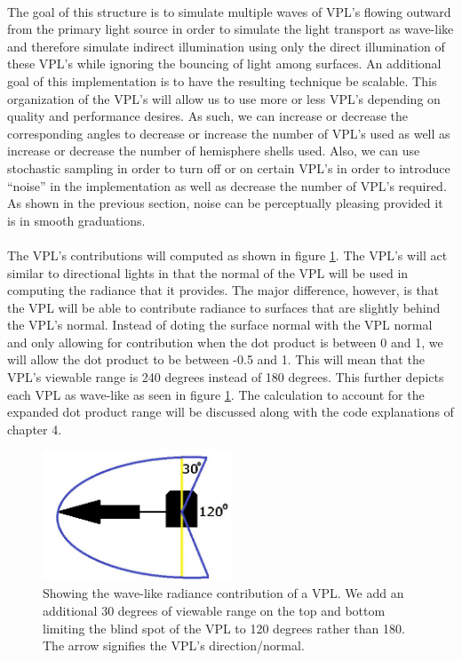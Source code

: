 \paragraph{}
The goal of this structure is to simulate multiple waves of VPL's flowing outward from the primary light source in order to simulate the light transport as wave-like and therefore simulate indirect illumination using only the direct illumination of these VPL's while ignoring the bouncing of light among surfaces.  An additional goal of this implementation is to have the resulting technique be scalable.  This organization of the VPL's will allow us to use more or less VPL's depending on quality and performance desires.  As such, we can increase or decrease the corresponding angles to decrease or increase the number of VPL's used as well as increase or decrease the number of hemisphere shells used.  Also, we can use stochastic sampling in order to turn off or on certain VPL's in order to introduce ``noise'' in the implementation as well as decrease the number of VPL's required.  As shown in the previous section, noise can be perceptually pleasing provided it is in smooth graduations.

\paragraph{}
The VPL's contributions will computed as shown in figure \ref{fig:3.6}.  The VPL's will act similar to directional lights in that the normal of the VPL will be used in computing the radiance that it provides.  The major difference, however, is that the VPL will be able to contribute radiance to surfaces that are slightly behind the VPL's normal.  Instead of doting the surface normal with the VPL normal and only allowing for contribution when the dot product is between 0 and 1, we will allow the dot product to be between -0.5 and 1.  This will mean that the VPL's viewable range is 240 degrees instead of 180 degrees.  This further depicts each VPL as wave-like as seen in figure \ref{fig:3.6}.  The calculation to account for the expanded dot product range will be discussed along with the code explanations of chapter 4.

\begin{figure}[h!]
  \centering
    \includegraphics[width=0.5\textwidth]{Figure36.jpg}
  \caption{Showing the wave-like radiance contribution of a VPL. We add an additional 30 degrees of viewable range on the top and bottom limiting the blind spot of the VPL to 120 degrees rather than 180. The arrow signifies the VPL's direction/normal.}
	\label{fig:3.6}
\end{figure}

